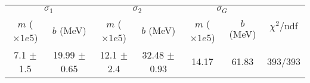 \begin{tabular}{cc|cc|cc||c}
\multicolumn{2}{c|}{$\sigma_1$} & \multicolumn{2}{|c}{$\sigma_2$} & \multicolumn{2}{|c}{$\sigma_G$}  & \multirow{2}{*}{$\chi^2/$ndf}\\
$m$ ($\times1e5$) & $b$ (MeV) & $m$ ($\times1e5$) & $b$ (MeV) & $m$ ($\times1e5$) & $b$ (MeV) & \\
\hline
7.1 $\pm$ 1.5 & 19.99 $\pm$ 0.65 & 12.1 $\pm$ 2.4 & 32.48 $\pm$ 0.93 & 14.17 & 61.83 & 393/393\\
\end{tabular}
